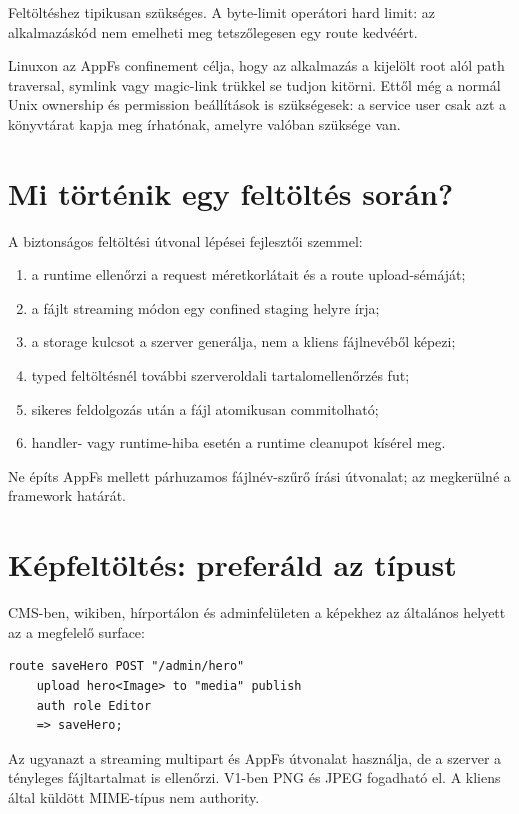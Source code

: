 Feltöltéshez tipikusan  szükséges. A byte-limit operátori hard limit: az alkalmazáskód nem emelheti meg tetszőlegesen egy route kedvéért.

Linuxon az AppFs confinement célja, hogy az alkalmazás a kijelölt root alól path traversal, symlink vagy magic-link trükkel se tudjon kitörni. Ettől még a normál Unix ownership és permission beállítások is szükségesek: a service user csak azt a könyvtárat kapja meg írhatónak, amelyre valóban szüksége van.

\section{Mi történik egy feltöltés során?}

A biztonságos feltöltési útvonal lépései fejlesztői szemmel:

\begin{enumerate}
  \item a runtime ellenőrzi a request méretkorlátait és a route upload-sémáját;
  \item a fájlt streaming módon egy confined staging helyre írja;
  \item a storage kulcsot a szerver generálja, nem a kliens fájlnevéből képezi;
  \item typed feltöltésnél további szerveroldali tartalomellenőrzés fut;
  \item sikeres feldolgozás után a fájl atomikusan commitolható;
  \item handler- vagy runtime-hiba esetén a runtime cleanupot kísérel meg.
\end{enumerate}

Ne építs AppFs mellett párhuzamos fájlnév-szűrő írási útvonalat; az megkerülné a framework határát.

\section{Képfeltöltés: preferáld az  típust}

CMS-ben, wikiben, hírportálon és adminfelületen a képekhez az általános  helyett az  a megfelelő surface:

\begin{lstlisting}[language=Velran]
route saveHero POST "/admin/hero"
    upload hero<Image> to "media" publish
    auth role Editor
    => saveHero;
\end{lstlisting}

Az  ugyanazt a streaming multipart és AppFs útvonalat használja, de a szerver a tényleges fájltartalmat is ellenőrzi. V1-ben PNG és JPEG fogadható el. A kliens által küldött MIME-típus nem authority.

